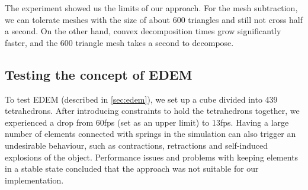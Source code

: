 

The experiment showed us the limits of our approach. For the mesh subtraction, we can tolerate meshes with the size of about 600 triangles and still not cross half a second. On the other hand, convex decomposition times grow significantly faster, and the 600 triangle mesh takes a second to decompose.


\subsection{Testing the concept of EDEM}
To test EDEM (described in \cref{sec:edem}), we set up a cube divided into 439 tetrahedrons. After introducing constraints to hold the tetrahedrons together, we experienced a drop from 60fps (set as an upper limit) to 13fps. Having a large number of elements connected with springs in the simulation can also trigger an undesirable behaviour, such as contractions, retractions and self-induced explosions of the object. Performance issues and problems with keeping elements in a stable state concluded that the approach was not suitable for our implementation.




